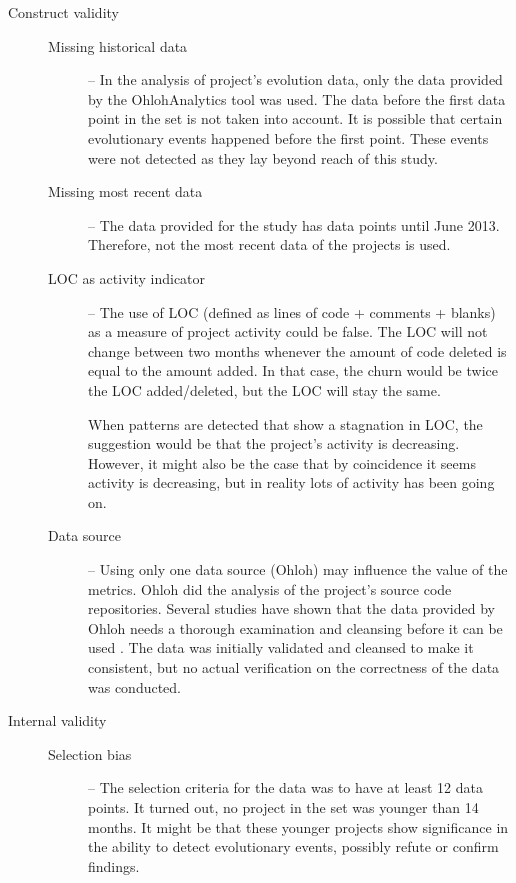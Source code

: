 \begin{description}
	\item[Construct validity] \hfill
	
	\begin{description}
		\item[\rm{Missing historical data}] -- In the analysis of project's
			evolution data, only the data provided by the OhlohAnalytics tool
			\cite{ohlohanalytics, bruntink2013} was used.
			The data before the first data point in the set is not taken into account. It
			is possible that certain evolutionary events happened before the first point.
			These events were not detected as they lay beyond reach of this study.

		\item[\rm{Missing most recent data}] -- The data provided for the study has
			data points until June 2013. Therefore, not the most recent data of the
			projects is used.

		\item[\rm{LOC as activity indicator}] -- The use of LOC (defined as
			lines of code + comments + blanks) as a measure of project activity could be
			false. The LOC will not change between two months whenever the amount of code
			deleted is equal to the amount added. In that case, the churn would be twice
			the LOC added/deleted, but the LOC will stay the same.

			When patterns are detected that show a stagnation in LOC, the suggestion
			would be that the project's activity is decreasing. However, it might also
			be the case that by coincidence it seems activity is decreasing, but in
			reality lots of activity has been going on.

		\item[\rm{Data source}] -- Using only one data source (Ohloh) may
			influence the value of the metrics. Ohloh did the analysis of the project's
			source code repositories. Several studies have shown that the data provided
			by Ohloh needs a thorough examination and cleansing before it can be used
			\cite{bruntink2013, ohlohanalytics, bruntink2014}. The data was initially
			validated and cleansed to make it consistent, but no actual verification on
			the correctness of the data was conducted.
	\end{description}

	\item[Internal validity] \hfill

	\begin{description}
		\item[\rm{Selection bias}] -- The selection criteria for the data was to have
			at least 12 data points. It turned out, no project in the set was younger
			than 14 months. It might be that these younger projects show significance in
			the ability to detect evolutionary events, possibly refute or confirm
			findings.
	\end{description}


\end{description}

